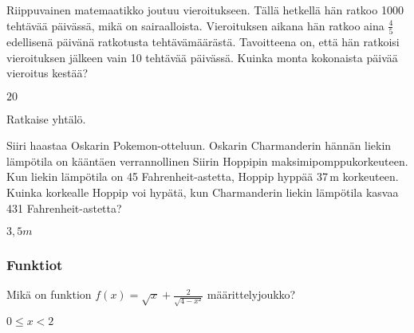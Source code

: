 \begin{tehtava}
	Riippuvainen matemaatikko joutuu vieroitukseen. Tällä hetkellä hän ratkoo 1000 tehtävää päivässä, mikä on sairaalloista. Vieroituksen aikana hän ratkoo aina $\frac{4}{5}$ edellisenä päivänä ratkotusta tehtävämäärästä. Tavoitteena on, että hän ratkoisi vieroituksen jälkeen vain 10 tehtävää päivässä. Kuinka monta kokonaista päivää vieroitus kestää?
	

\begin{vastaus}
	$20$
\end{vastaus}
\end{tehtava}

\begin{tehtava}
	Ratkaise yhtälö.
	\begin{alakohdat}
	
	\end{alakohdat}
	

\begin{vastaus}
	\begin{alakohdat}
		\alakohta{$x=-6$}
		\alakohta{$x=-\frac{5}{9}$}
		
	\end{alakohdat}
\end{vastaus}
\end{tehtava}

\begin{tehtava}
	Siiri haastaa Oskarin Pokemon-otteluun. Oskarin Charmanderin hännän liekin lämpötila on kääntäen verrannollinen Siirin Hoppipin maksimipomppukorkeuteen. Kun liekin lämpötila on 45 Fahrenheit-astetta, Hoppip hyppää 37\,m korkeuteen. Kuinka korkealle Hoppip voi hypätä, kun Charmanderin liekin lämpötila kasvaa 431 Fahrenheit-astetta?
	

\begin{vastaus}
	$3,5m$
\end{vastaus}
\end{tehtava}



\subsubsection*{Funktiot}

\begin{tehtava}
	Mikä on funktion $f(x)=\sqrt{x}+\frac{2}{\sqrt{4-x²}}$ määrittelyjoukko?
	

\begin{vastaus}
	{$0\leq x<2$}
		
\end{vastaus}
\end{tehtava}

